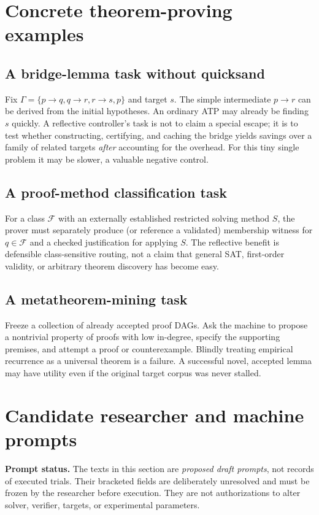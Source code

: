 \documentclass[11pt,letterpaper]{article}
\begin{document}
\section{Concrete theorem-proving examples}
\subsection{A bridge-lemma task without quicksand}
Fix $\Gamma=\{p\to q,q\to r,r\to s,p\}$ and target $s$. The simple intermediate $p\to r$ can be derived from the initial hypotheses. An ordinary ATP may already be finding $s$ quickly. A reflective controller's task is not to claim a special escape; it is to test whether constructing, certifying, and caching the bridge yields savings over a family of related targets \emph{after} accounting for the overhead. For this tiny single problem it may be slower, a valuable negative control.

\subsection{A proof-method classification task}
For a class $\mathcal F$ with an externally established restricted solving method $S$, the prover must separately produce (or reference a validated) membership witness for $q\in\mathcal F$ and a checked justification for applying $S$. The reflective benefit is defensible class-sensitive routing, not a claim that general SAT, first-order validity, or arbitrary theorem discovery has become easy.

\subsection{A metatheorem-mining task}
Freeze a collection of already accepted proof DAGs. Ask the machine to propose a nontrivial property of proofs with low in-degree, specify the supporting premises, and attempt a proof or counterexample. Blindly treating empirical recurrence as a universal theorem is a failure. A successful novel, accepted lemma may have utility even if the original target corpus was never stalled.

\section{Candidate researcher and machine prompts}
\begin{statusbox}
\textbf{Prompt status.} The texts in this section are \emph{proposed draft prompts}, not records of executed trials. Their bracketed fields are deliberately unresolved and must be frozen by the researcher before execution. They are not authorizations to alter solver, verifier, targets, or experimental parameters.
\end{statusbox}
\end{document}
